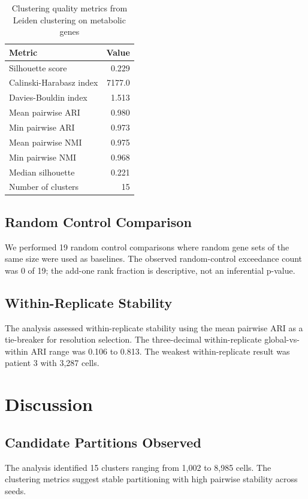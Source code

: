 \documentclass[sloppy]{article}
\begin{document}
\begin{table}[h]
\centering
\caption{Clustering quality metrics from Leiden clustering on metabolic genes}
\label{tab:clustering_metrics}
\begin{tabular}{lr}
\toprule
Metric & Value \\
\midrule
Silhouette score & 0.229 \\
Calinski-Harabasz index & 7177.0 \\
Davies-Bouldin index & 1.513 \\
Mean pairwise ARI & 0.980 \\
Min pairwise ARI & 0.973 \\
Mean pairwise NMI & 0.975 \\
Min pairwise NMI & 0.968 \\
Median silhouette & 0.221 \\
Number of clusters & 15 \\
\bottomrule
\end{tabular}
\end{table}

\subsection{Random Control Comparison}
We performed 19 random control comparisons where random gene sets of the same size were used as baselines. The observed random-control exceedance count was 0 of 19; the add-one rank fraction is descriptive, not an inferential p-value.

\subsection{Within-Replicate Stability}
The analysis assessed within-replicate stability using the mean pairwise ARI as a tie-breaker for resolution selection. The three-decimal within-replicate global-vs-within ARI range was 0.106 to 0.813. The weakest within-replicate result was patient 3 with 3,287 cells.

\section{Discussion}

\subsection{Candidate Partitions Observed}
The analysis identified 15 clusters ranging from 1,002 to 8,985 cells. The clustering metrics suggest stable partitioning with high pairwise stability across seeds.
\end{document}

